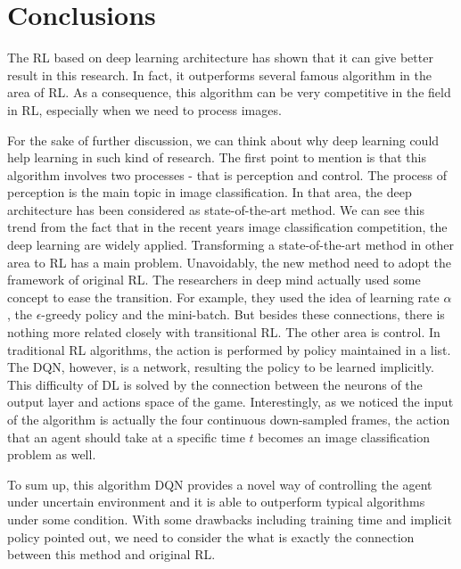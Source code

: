 \documentclass{article}
\begin{document}
\section{Conclusions}
The RL based on deep learning architecture has shown that it can give better result in this research. In fact, it outperforms several famous algorithm in the area of RL. As a consequence, this algorithm can be very competitive in the field in RL, especially when we need to process images. 

For the sake of further discussion, we can think about why deep learning could help learning in such kind of research. The first point to mention is that this algorithm involves two processes - that is perception and control. The process of perception is the main topic in image classification. In that area, the deep architecture has been considered as state-of-the-art method. We can see this trend from the fact that in the recent years image classification competition, the deep learning are widely applied. Transforming a state-of-the-art method in other area to RL has a main problem. Unavoidably, the new method need to adopt the framework of original RL. The researchers in deep mind actually used some concept to ease the transition. For example, they used the idea of learning rate $\alpha$ , the $\epsilon$-greedy policy and the mini-batch. But besides these connections, there is nothing more related closely with transitional RL. The other area is control. In traditional RL algorithms, the action is performed by policy maintained in a list. The DQN, however, is a network, resulting the policy to be learned implicitly. This difficulty of DL is solved by the connection between the neurons of the output layer and actions space of the game. Interestingly, as we noticed the input of the algorithm is actually the four continuous down-sampled frames, the action that an agent should take at a specific time $t$ becomes an image classification problem as well.

To sum up, this algorithm DQN provides a novel way of controlling the agent under uncertain environment and it is able to outperform typical algorithms under some condition. With some drawbacks including training time and implicit policy pointed out, we need to consider the what is exactly the connection between this method and original RL.

\nocite{langley00}


\end{document}
